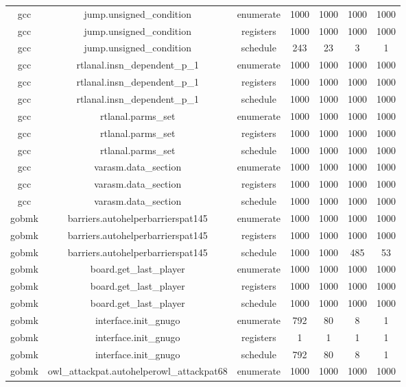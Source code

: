 \begin{center}
\begin{longtable}{c|c|c|c|c|c|c}
		gcc & jump.unsigned\_condition & enumerate & 1000 & 1000 & 1000 & 1000 \\
		gcc & jump.unsigned\_condition & registers & 1000 & 1000 & 1000 & 1000 \\
		gcc & jump.unsigned\_condition & schedule & 243 & 23 & 3 & 1 \\
		\hline
		gcc & rtlanal.insn\_dependent\_p\_1 & enumerate & 1000 & 1000 & 1000 & 1000 \\
		gcc & rtlanal.insn\_dependent\_p\_1 & registers & 1000 & 1000 & 1000 & 1000 \\
		gcc & rtlanal.insn\_dependent\_p\_1 & schedule & 1000 & 1000 & 1000 & 1000 \\
		\hline
		gcc & rtlanal.parms\_set & enumerate & 1000 & 1000 & 1000 & 1000 \\
		gcc & rtlanal.parms\_set & registers & 1000 & 1000 & 1000 & 1000 \\
		gcc & rtlanal.parms\_set & schedule & 1000 & 1000 & 1000 & 1000 \\
		\hline
		gcc & varasm.data\_section & enumerate & 1000 & 1000 & 1000 & 1000 \\
		gcc & varasm.data\_section & registers & 1000 & 1000 & 1000 & 1000 \\
		gcc & varasm.data\_section & schedule & 1000 & 1000 & 1000 & 1000 \\
		\hline
		gobmk & barriers.autohelperbarrierspat145 & enumerate & 1000 & 1000 & 1000 & 1000 \\
		gobmk & barriers.autohelperbarrierspat145 & registers & 1000 & 1000 & 1000 & 1000 \\
		gobmk & barriers.autohelperbarrierspat145 & schedule & 1000 & 1000 & 485 & 53 \\
		\hline
		gobmk & board.get\_last\_player & enumerate & 1000 & 1000 & 1000 & 1000 \\
		gobmk & board.get\_last\_player & registers & 1000 & 1000 & 1000 & 1000 \\
		gobmk & board.get\_last\_player & schedule & 1000 & 1000 & 1000 & 1000 \\
		\hline
		gobmk & interface.init\_gnugo & enumerate & 792 & 80 & 8 & 1 \\
		gobmk & interface.init\_gnugo & registers & 1 & 1 & 1 & 1 \\
		gobmk & interface.init\_gnugo & schedule & 792 & 80 & 8 & 1 \\
		\hline
		gobmk & owl\_attackpat.autohelperowl\_attackpat68 & enumerate & 1000 & 1000 & 1000 & 1000 \\

\end{longtable}
\end{center}
